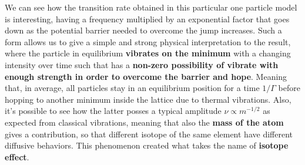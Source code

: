 \noindent
We can see how the transition rate obtained in this particular one particle model is interesting, having a frequency multiplied by an exponential factor that goes down as the potential barrier needed to overcome the jump increases. Such a form allows us to give a simple and strong physical interpretation to the result, where the particle in equilibrium \textbf{vibrates on the minimum} with a changing intensity over time such that has a \textbf{non-zero possibility of vibrate with enough strength in order to overcome the barrier and hope}. Meaning that, in average, all particles stay in an equilibrium position for a time $1/\Gamma$ before hopping to another minimum inside the lattice due to thermal vibrations. Also, it's possible to see how the latter posses a typical amplitude $\nu\propto m^{-1/2}$ as expected from classical vibrations, meaning that also the \textbf{mass of the atom} gives a contribution, so that different isotope of the same element have different diffusive behaviors. This phenomenon created what takes the name of \textbf{isotope effect}.

